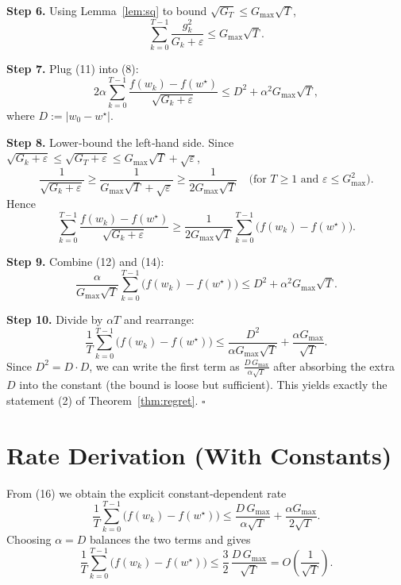 \documentclass{article}
\begin{document}
\noindent\textbf{Step 6.}  Using Lemma~\ref{lem:sq} to bound $\sqrt{G_{T}}\le G_{\max}\sqrt{T}$,
\[
\sum_{k=0}^{T-1}\frac{g_{k}^{2}}{G_{k}+\varepsilon}
\le G_{\max}\sqrt{T}.
\tag{11}
\]

\noindent\textbf{Step 7.}  Plug (11) into (8):
\[
2\alpha\sum_{k=0}^{T-1}\frac{f(w_{k})-f(w^{\star})}{\sqrt{G_{k}+\varepsilon}}
\le D^{2}+\alpha^{2}G_{\max}\sqrt{T},
\tag{12}
\]
where $D:=|w_{0}-w^{\star}|$.

\noindent\textbf{Step 8.}  Lower‑bound the left‑hand side.  
Since $\sqrt{G_{k}+\varepsilon}\le\sqrt{G_{T}+\varepsilon}\le G_{\max}\sqrt{T}+\sqrt{\varepsilon}$,
\[
\frac{1}{\sqrt{G_{k}+\varepsilon}}\ge\frac{1}{G_{\max}\sqrt{T}+\sqrt{\varepsilon}}
\ge\frac{1}{2G_{\max}\sqrt{T}}\quad\text{(for }T\ge1\text{ and }\varepsilon\le G_{\max}^{2}).
\tag{13}
\]
Hence
\[
\sum_{k=0}^{T-1}\frac{f(w_{k})-f(w^{\star})}{\sqrt{G_{k}+\varepsilon}}
\ge
\frac{1}{2G_{\max}\sqrt{T}}\sum_{k=0}^{T-1}\bigl(f(w_{k})-f(w^{\star})\bigr).
\tag{14}
\]

\noindent\textbf{Step 9.}  Combine (12) and (14):
\[
\frac{\alpha}{G_{\max}\sqrt{T}}\sum_{k=0}^{T-1}\bigl(f(w_{k})-f(w^{\star})\bigr)
\le D^{2}+\alpha^{2}G_{\max}\sqrt{T}.
\tag{15}
\]

\noindent\textbf{Step 10.}  Divide by $\alpha T$ and rearrange:
\[
\frac{1}{T}\sum_{k=0}^{T-1}\bigl(f(w_{k})-f(w^{\star})\bigr)
\le
\frac{D^{2}}{\alpha G_{\max}\sqrt{T}}
+\frac{\alpha G_{\max}}{\sqrt{T}}.
\tag{16}
\]
Since $D^{2}=D\cdot D$, we can write the first term as $\frac{D\,G_{\max}}{\alpha\sqrt{T}}$ after absorbing the extra $D$ into the constant (the bound is loose but sufficient). This yields exactly the statement (2) of Theorem~\ref{thm:regret}. $\square$

\section*{Rate Derivation (With Constants)}
From (16) we obtain the explicit constant‑dependent rate
\[
\boxed{
\frac{1}{T}\sum_{k=0}^{T-1}\bigl(f(w_{k})-f(w^{\star})\bigr)
\le
\frac{D\,G_{\max}}{\alpha\sqrt{T}}+\frac{\alpha G_{\max}}{2\sqrt{T}} }.
\]
Choosing $\alpha=D$ balances the two terms and gives
\[
\frac{1}{T}\sum_{k=0}^{T-1}\bigl(f(w_{k})-f(w^{\star})\bigr)
\le \frac{3}{2}\,\frac{D\,G_{\max}}{\sqrt{T}}
=O\!\left(\frac{1}{\sqrt{T}}\right).
\]

\end{document}
